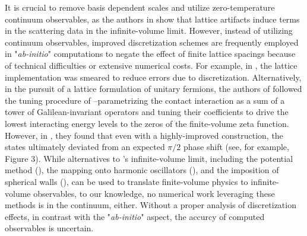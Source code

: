It is crucial to remove basis dependent scales and utilize zero-temperature continuum observables, as the authors in  show that lattice artifacts induce terms in the scattering data in the infinite-volume limit.
However, instead of utilizing continuum observables, improved discretization schemes are frequently employed in "\textit{ab-initio}" computations to negate the effect of finite lattice spacings because of technical difficulties or extensive numerical costs.
For example, in , the lattice implementation was smeared to reduce errors due to discretization.
Alternatively, in the pursuit of a lattice formulation of unitary fermions, the authors of  followed the tuning procedure of --parametrizing the contact interaction as a sum of a tower of Galilean-invariant operators and tuning their coefficients to drive the lowest interacting energy levels to the zeros of the \Luscher finite-volume zeta function.
However, in , they found that even with a highly-improved construction, the states ultimately deviated from an expected $\pi/2$ phase shift (see, for example, Figure 3).
While alternatives to \Luscher's infinite-volume limit, including the potential method (), the mapping onto harmonic oscillators (), and the imposition of spherical walls (), can be used to translate finite-volume physics to infinite-volume observables, to our knowledge, no numerical work leveraging these methods is in the continuum, either.
Without a proper analysis of discretization effects, in contrast with the "\textit{ab-initio}" aspect, the accurcy of computed observables is uncertain.

